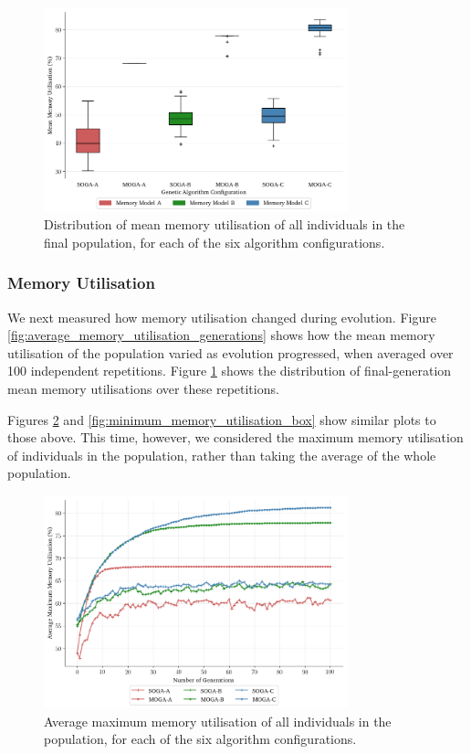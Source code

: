 \documentclass[conference]{IEEEtran}
\begin{document}
\begin{figure}[!ht]
  \centering
  \includegraphics*[width=8.8cm,keepaspectratio]{img/mean_memory_util_box}
\vspace{-4ex}
  \caption{Distribution of mean memory utilisation of all individuals in the final population, for each of the six algorithm configurations.}
  \label{fig:average_memory_utilisation_box}
\vspace{-2ex}
\end{figure}

\subsubsection{Memory Utilisation}

We next measured how memory utilisation changed during evolution. Figure \ref{fig:average_memory_utilisation_generations} shows how the mean memory utilisation of the population varied as evolution progressed, when averaged over 100 independent repetitions. Figure \ref{fig:average_memory_utilisation_box} shows the distribution of final-generation mean memory utilisations over these repetitions. 
	
Figures \ref{fig:minimum_memory_utilisation_generations} and \ref{fig:minimum_memory_utilisation_box} show similar plots to those above. This time, however, we considered the maximum memory utilisation of individuals in the population, rather than taking the average of the whole population. 

\begin{figure}[!t]
  \centering
  \includegraphics*[width=8.8cm,keepaspectratio]{img/maximum_memory_util_generations}
  \caption{Average maximum memory utilisation of all individuals in the population, for each of the six algorithm configurations.}
  \label{fig:minimum_memory_utilisation_generations}
\vspace{-2.5ex}
\end{figure}
\end{document}
